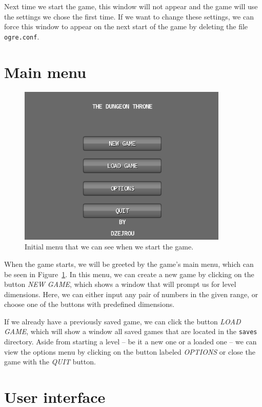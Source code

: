 Next time we start the game, this window will not appear and the game will use the settings we chose the first time. If we want to change
these settings, we can force this window to appear on the next start of the game by deleting the file \texttt{ogre.conf}.

\section{Main menu}

\begin{figure}[H]
    \centering
    \includegraphics[width=10cm]{../img/gui-intro.png}
    \caption{Initial menu that we can see when we start the game.}
    \label{gui-intro}
\end{figure}

When the game starts, we will be greeted by the game's main menu, which can be seen in Figure~\ref{gui-intro}. In this menu, we can create
a new game by clicking on the button \emph{NEW GAME}, which shows a window that will prompt us for level dimensions. Here, we can either
input any pair of numbers in the given range, or choose one of the buttons with predefined dimensions.

If we already have a previously saved game, we can click the button \emph{LOAD GAME}, which will show a window all saved games that are
located in the \texttt{saves} directory. Aside from starting a level -- be it a new one or a loaded one -- we can view the options menu by
clicking on the button labeled \emph{OPTIONS} or close the game with the \emph{QUIT} button.

\section{User interface}

